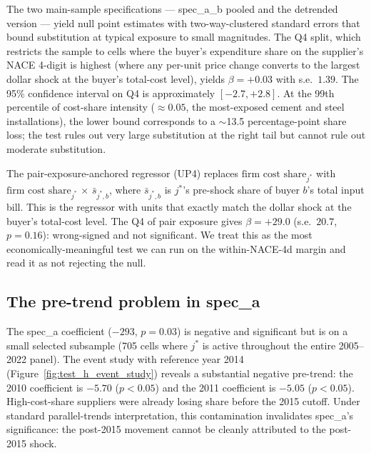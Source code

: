 The two main-sample specifications --- spec\_a\_b pooled and the detrended version --- yield null point estimates with two-way-clustered standard errors that bound substitution at typical exposure to small magnitudes. The Q4 split, which restricts the sample to cells where the buyer's expenditure share on the supplier's NACE 4-digit is highest (\ie where any per-unit price change converts to the largest dollar shock at the buyer's total-cost level), yields $\beta = +0.03$ with s.e.\ $1.39$. The 95\% confidence interval on Q4 is approximately $[-2.7, +2.8]$. At the 99th percentile of cost-share intensity ($\approx 0.05$, the most-exposed cement and steel installations), the lower bound corresponds to a $\sim$13.5 percentage-point share loss; the test rules out very large substitution at the right tail but cannot rule out moderate substitution.

The pair-exposure-anchored regressor (UP4) replaces $\text{firm cost share}_{j^*}$ with $\text{firm cost share}_{j^*}\,\times\,\bar{s}_{j^*,b}$, where $\bar{s}_{j^*,b}$ is $j^*$'s pre-shock share of buyer $b$'s total input bill. This is the regressor with units that exactly match the dollar shock at the buyer's total-cost level. The Q4 of pair exposure gives $\beta = +29.0$ (s.e.\ $20.7$, $p = 0.16$): wrong-signed and not significant. We treat this as the most economically-meaningful test we can run on the within-NACE-4d margin and read it as not rejecting the null.

\subsection{The pre-trend problem in spec\_a}

The spec\_a coefficient ($-293$, $p = 0.03$) is negative and significant but is on a small selected subsample (705 cells where $j^*$ is active throughout the entire 2005--2022 panel). The event study with reference year 2014 (Figure~\ref{fig:test_h_event_study}) reveals a substantial negative pre-trend: the 2010 coefficient is $-5.70$ ($p < 0.05$) and the 2011 coefficient is $-5.05$ ($p < 0.05$). High-cost-share suppliers were already losing share before the 2015 cutoff. Under standard parallel-trends interpretation, this contamination invalidates spec\_a's significance: the post-2015 movement cannot be cleanly attributed to the post-2015 shock.

